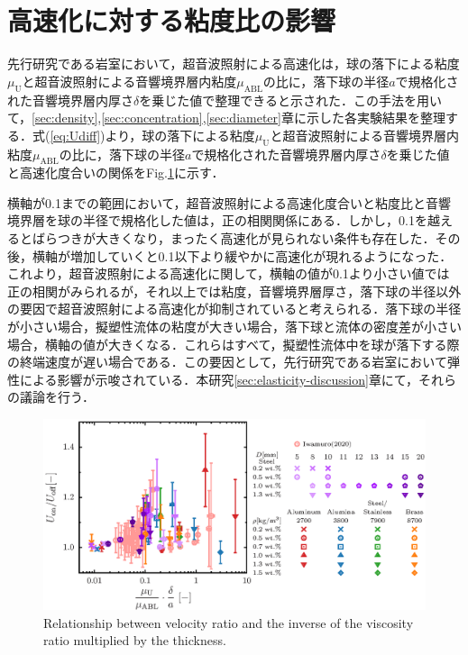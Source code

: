 \section{高速化に対する粘度比の影響}
\label{sec:viscosity}
先行研究である岩室\cite{ref:8}において，超音波照射による高速化は，球の落下による粘度$\mu_\text{U}$と超音波照射による音響境界層内粘度$\mu_\text{ABL}$の比に，落下球の半径$a$で規格化された音響境界層内厚さ$\delta$を乗じた値で整理できると示された．この手法を用いて，\ref{sec:density},\ref{sec:concentration},\ref{sec:diameter}章に示した各実験結果を整理する．式(\ref{eq:Udiff})より，球の落下による粘度$\mu_\text{U}$と超音波照射による音響境界層内粘度$\mu_\text{ABL}$の比に，落下球の半径$a$で規格化された音響境界層内厚さ$\delta$を乗じた値と高速化度合いの関係をFig.\ref{fig:viscosity_ratio}に示す．

横軸が0.1までの範囲において，超音波照射による高速化度合いと粘度比と音響境界層を球の半径で規格化した値は，正の相関関係にある．しかし，0.1を越えるとばらつきが大きくなり，まったく高速化が見られない条件も存在した．その後，横軸が増加していくと0.1以下より緩やかに高速化が現れるようになった．これより，超音波照射による高速化に関して，横軸の値が0.1より小さい値では正の相関がみられるが，それ以上では粘度，音響境界層厚さ，落下球の半径以外の要因で超音波照射による高速化が抑制されていると考えられる．落下球の半径が小さい場合，擬塑性流体の粘度が大きい場合，落下球と流体の密度差が小さい場合，横軸の値が大きくなる．これらはすべて，擬塑性流体中を球が落下する際の終端速度が遅い場合である．この要因として，先行研究である岩室\cite{ref:8}において弾性による影響が示唆されている．本研究\ref{sec:elasticity-discussion}章にて，それらの議論を行う．

\begin{figure}[ht]
    \centering
    \includegraphics[width=1.0\textwidth]{5-Results/viscosity.eps}
    \caption{Relationship between velocity ratio and the inverse of the viscosity ratio multiplied by the thickness.}
    \label{fig:viscosity_ratio}
\end{figure}

